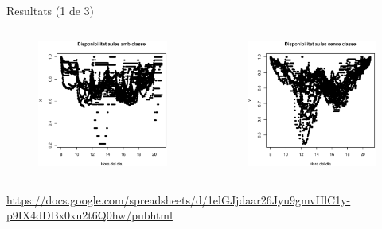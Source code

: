 \documentclass[xetex,mathserif,serif]{beamer}
\begin{document}
  \begin{frame}{Resultats (1 de 3)}
    \begin{columns}[T]
    \begin{column}{0.4\linewidth}
      \begin{figure}
      \includegraphics[width=1\linewidth]{./images/dades_X.eps}
      \end{figure}
    \end{column}
    \begin{column}{0.4\linewidth}
      \begin{figure}
      \includegraphics[width=1\linewidth]{./images/dades_Y.eps}
      \end{figure}
    \end{column}
    \end{columns}
    \url{https://docs.google.com/spreadsheets/d/1elGJjdaar26Jyu9gmvHlC1y-p9IX4dDBx0xu2t6Q0hw/pubhtml}
  \end{frame}
  
\end{document}
